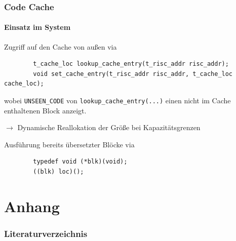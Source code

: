 \documentclass[german]{tum-presentation}
\newcommand{\refer}[0]{\ensuremath{\rightarrow} }
\begin{document}
\begin{frame}[fragile]
	\frametitle{Code Cache}
	\framesubtitle{Einsatz im System}
	
	Zugriff auf den Cache von außen via
	\begin{lstlisting}
		t_cache_loc lookup_cache_entry(t_risc_addr risc_addr);
		void set_cache_entry(t_risc_addr risc_addr, t_cache_loc cache_loc);
	\end{lstlisting}
	
	wobei \verb!UNSEEN_CODE! von \verb!lookup_cache_entry(...)! einen nicht im Cache enthaltenen Block anzeigt.
	
	\refer Dynamische Reallokation der Größe bei Kapazitätsgrenzen
	
	\vspace{0.5cm}
	\pause
	Ausführung bereits übersetzter Blöcke via
	\begin{lstlisting}
		typedef void (*blk)(void);
		((blk) loc)();
	\end{lstlisting}
\end{frame}


\section{Anhang}
\begin{frame}
 	\frametitle{Literaturverzeichnis}
 	\printbibliography
\end{frame}
\end{document}
